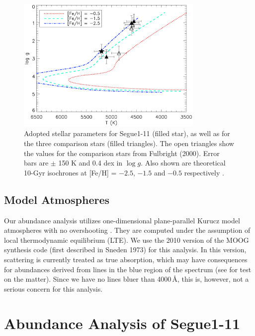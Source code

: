 \documentclass[manuscript]{aastex}
\begin{document}
\begin{figure}
 \begin{center}
  \includegraphics[width=9cm]{isochrones_10Gyr.ps}
  \caption{Adopted stellar parameters for Segue1-11 (filled star), as well as for the three comparison stars (filled triangles). The open triangles show the values for the comparison stars from Fulbright (2000). Error bars are $\pm$ 150 K and 0.4 dex in $\log g$. Also shown are theoretical 10-Gyr isochrones at [Fe/H] = $-2.5$, $-1.5$ and $-0.5$ respectively \citep{Kim2002}.}
  \label{fig:isochr}
 \end{center}
\end{figure}

\subsection{Model Atmospheres}
Our abundance analysis utilizes one-dimensional plane-parallel Kurucz
model atmospheres with no overshooting \citep{kurucz}. They are computed
under the assumption of local thermodynamic equilibrium (LTE). We use the
2010 version of the MOOG synthesis code (first described in Sneden 1973)\nocite{moog}
for this analysis.  In this version, scattering is currently treated as
true absorption, which may have consequences for abundances derived from
lines in the blue region of the spectrum (see \citet{Frebel2010a} for test on
the matter). Since we have no lines bluer than 4000\,{\AA}, this is, however,
not a serious concern for this analysis.




\section{Abundance Analysis of Segue1-11}
\label{sec:abund}
\end{document}
